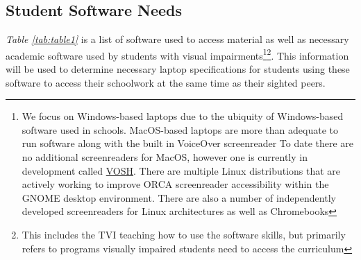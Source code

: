 \pagebreak\hypertarget{student-software-needs}{}\subsection{Student Software Needs}\label{student-software-needs}
\textit{Table \ref{tab:table1}} is a list of software used to access material as well as necessary academic software used by students with visual impairments\footnote{\raggedright We focus on Windows-based laptops due to the ubiquity of Windows-based software used in schools. MacOS-based laptops are more than adequate to run software along with the built in VoiceOver screenreader  To date there are no additional screenreaders for MacOS, however one is currently in development called \href{http://youtu.be/qTkS-zNzF88?si=3XTXtbyOWD9kvwlk}{VOSH}. There are multiple Linux distributions that are actively working to improve ORCA screenreader accessibility within the GNOME desktop environment. There are also a number of independently developed screenreaders for Linux architectures as well as Chromebooks}\fnsep\footnote{\raggedright This includes the TVI teaching how to use the software skills, but primarily refers to programs visually impaired students need to access the curriculum}. This information will be used to determine necessary laptop specifications for students using these software to access their schoolwork at the same time as their sighted peers.

